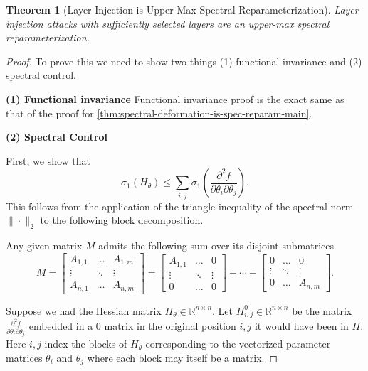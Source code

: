 \documentclass{article}
\theoremstyle{plain}
\newtheorem{theorem}{Theorem}
\theoremstyle{definition}
\theoremstyle{remark}
\begin{document}
\begin{theorem}[Layer Injection is Upper-Max Spectral Reparameterization]
\label{thm:layer-injection-reparameterization}
Layer injection attacks with sufficiently selected layers are an upper-max spectral reparameterization.
\end{theorem}
\begin{proof}
To prove this we need to show two things (1) functional invariance and (2) spectral control.

\textbf{(1) Functional invariance}
Functional invariance proof is the exact same as that of the proof for \cref{thm:spectral-deformation-is-spec-reparam-main}.


\textbf{(2) Spectral Control}

First, we show that \[
\sigma_1(H_{\theta}) \leq \sum_{i,j}\sigma_1 \left(\frac{\partial^2 f}{
\partial \theta_i \partial \theta_j
} \right).
\] This follows from the application of the triangle inequality of the spectral norm $\| \cdot\|_2$ to the following block decomposition.

Any given matrix $M$ admits the following sum over its disjoint submatrices
\begin{equation*}
M = \begin{bmatrix}
A_{1,1} & \ldots & A_{1,m} \\
\vdots & \ddots & \vdots \\
A_{n,1} & \ldots & A_{n,m}
\end{bmatrix} = \begin{bmatrix}
A_{1,1} & \ldots & 0 \\
\vdots & \ddots & \vdots \\
0 & \ldots & 0
\end{bmatrix}  + \cdots + \begin{bmatrix}
0 & \ldots & 0 \\
\vdots & \ddots & \vdots \\
0 & \ldots & A_{n,m}
\end{bmatrix}.
\end{equation*}

Suppose we had the Hessian matrix $H_{\theta} \in \mathbb{R}^{n \times n}$. Let $H_{i,j}^0 \in \mathbb{R}^{n \times n}$ be the matrix $\frac{\partial^2 f}{
\partial \theta_i \partial \theta_j
}$ embedded in a $0$ matrix in the original position $i,j$ it would have been in $H$. Here $i,j$ index the blocks of $H_{\theta}$ corresponding to the vectorized parameter matrices $\theta_i$ and $\theta_j$ where each block may itself be a matrix.


\end{proof}
\end{document}
